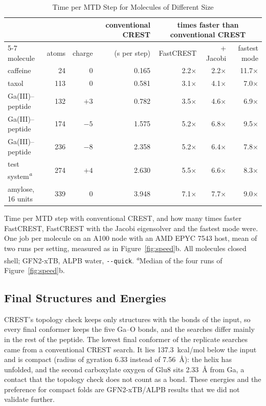 \documentclass[journal=jctcce,manuscript=article]{achemso}
\newcommand{\quickflag}{\texttt{-{}-quick}}
\begin{document}
\begin{table}[tbp]
\centering
\caption{Time per MTD Step for Molecules of Different Size}
\label{tab:size}
\small
\begin{tabular}{@{}lrrrrrr@{}}
\toprule
 & & & conventional CREST & \multicolumn{3}{c}{times faster than conventional CREST} \\
\cmidrule(l){5-7}
molecule & atoms & charge & (s per step) & FastCREST & + Jacobi & fastest mode \\
\midrule
caffeine & 24 & 0 & 0.165 & 2.2$\times$ & 2.2$\times$ & 11.7$\times$ \\
taxol & 113 & 0 & 0.581 & 3.1$\times$ & 4.1$\times$ & 7.0$\times$ \\
Ga(III)--peptide & 132 & $+3$ & 0.782 & 3.5$\times$ & 4.6$\times$ & 6.9$\times$ \\
Ga(III)--peptide & 174 & $-5$ & 1.575 & 5.2$\times$ & 6.8$\times$ & 9.5$\times$ \\
Ga(III)--peptide & 236 & $-8$ & 2.358 & 5.2$\times$ & 6.4$\times$ & 7.8$\times$ \\
test system\textsuperscript{\emph{a}} & 274 & $+4$ & 2.630 & 5.5$\times$ & 6.6$\times$ & 8.3$\times$ \\
amylose, 16 units & 339 & 0 & 3.948 & 7.1$\times$ & 7.7$\times$ & 9.0$\times$ \\
\bottomrule
\end{tabular}

\smallskip
\begin{minipage}{\textwidth}\raggedright\footnotesize
Time per MTD step with conventional CREST, and how many times faster FastCREST, FastCREST with the Jacobi eigensolver and the fastest mode were. One job per molecule on an A100 node with an AMD EPYC 7543 host, mean of two runs per setting, measured as in Figure~\ref{fig:speed}b. All molecules closed shell; GFN2-xTB, ALPB water, \quickflag. \textsuperscript{\emph{a}}Median of the four runs of Figure~\ref{fig:speed}b.
\end{minipage}
\end{table}

\subsection{Final Structures and Energies}
\label{sec:struct}

CREST's topology check keeps only structures with the bonds of the input, so every final conformer keeps the five Ga--O bonds, and the searches differ mainly in the rest of the peptide. The lowest final conformer of the replicate searches came from a conventional CREST search. It lies 137.3~kcal/mol below the input and is compact (radius of gyration 6.33 instead of 7.56~\AA): the helix has unfolded, and the second carboxylate oxygen of Glu8 sits 2.33~\AA{} from Ga, a contact that the topology check does not count as a bond. These energies and the preference for compact folds are GFN2-xTB/ALPB results that we did not validate further.
\end{document}
